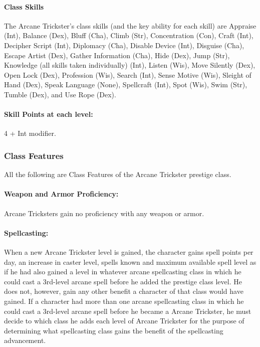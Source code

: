 \paragraph{Class Skills}
The Arcane Trickster's class skills (and the key ability for each skill) are Appraise (Int), Balance (Dex), Bluff (Cha), Climb (Str), Concentration (Con), Craft (Int), Decipher Script (Int), Diplomacy (Cha), Disable Device (Int), Disguise (Cha), Escape Artist (Dex), Gather Information (Cha), Hide (Dex), Jump (Str), Knowledge (all skills taken individually) (Int), Listen (Wis), Move Silently (Dex), Open Lock (Dex), Profession (Wis), Search (Int), Sense Motive (Wis), Sleight of Hand (Dex), Speak Language (None), Spellcraft (Int), Spot (Wis), Swim (Str), Tumble (Dex), and Use Rope (Dex).
\paragraph{Skill Points at each level:} 4 + Int modifier.

\subsubsection{Class Features}
All the following are Class Features of the Arcane Trickster prestige class.

\paragraph{Weapon and Armor Proficiency:} Arcane Tricksters gain no proficiency with any weapon or armor.

\paragraph{Spellcasting:} When a new Arcane Trickster level is gained, the character gains spell points per day, an increase in caster level, spells known and maximum available spell level as if he had also gained a level in whatever arcane spellcasting class in which he could cast a 3rd-level arcane spell before he added the prestige class level.
He does not, however, gain any other benefit a character of that class would have gained. 
If a character had more than one arcane spellcasting class in which he could cast a 3rd-level arcane spell before he became a Arcane Trickster, he must decide to which class he adds each level of Arcane Trickster for the purpose of determining what spellcasting class gains the benefit of the spellcasting advancement.

